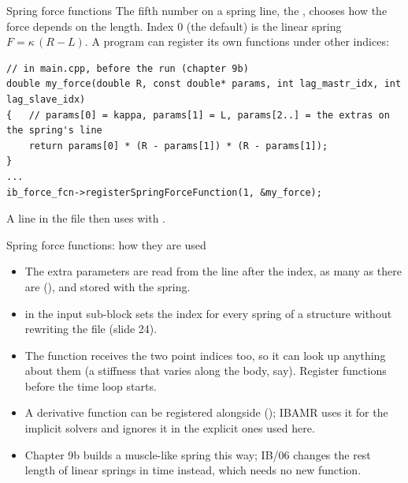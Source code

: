 \documentclass[aspectratio=169,11pt]{beamer}
\begin{document}
\begin{frame}[fragile]{Spring force functions}
\small The fifth number on a spring line, the , chooses how the force depends on the length. Index 0 (the default) is the linear spring $F = \kappa\,(R - L)$. A program can register its own functions under other indices:
\begin{lstlisting}[style=tiny]
// in main.cpp, before the run (chapter 9b)
double my_force(double R, const double* params, int lag_mastr_idx, int lag_slave_idx)
{   // params[0] = kappa, params[1] = L, params[2..] = the extras on the spring's line
    return params[0] * (R - params[1]) * (R - params[1]);
}
...
ib_force_fcn->registerSpringForceFunction(1, &my_force);
\end{lstlisting}
A line  in the  file then uses  with .
\end{frame}

\begin{frame}{Spring force functions: how they are used}
\begin{itemize}
  \item The extra parameters are read from the line after the index, as many as there are (), and stored with the spring.
  \item {} in the input sub-block sets the index for every spring of a structure without rewriting the file (slide 24).
  \item The function receives the two point indices too, so it can look up anything about them (a stiffness that varies along the body, say). Register functions before the time loop starts.
  \item A derivative function can be registered alongside (); IBAMR uses it for the implicit solvers and ignores it in the explicit ones used here.
  \item Chapter 9b builds a muscle-like spring this way; IB/06 changes the rest length of linear springs in time instead, which needs no new function.
\end{itemize}
\end{frame}
\end{document}
